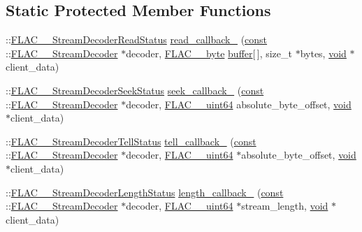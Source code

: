 \subsection*{Static Protected Member Functions}
\begin{DoxyCompactItemize}
\item 
\+::\hyperlink{group__flac__stream__decoder_gad793ead451206c64a91dc0b851027b93}{F\+L\+A\+C\+\_\+\+\_\+\+Stream\+Decoder\+Read\+Status} \hyperlink{class_f_l_a_c_1_1_decoder_1_1_stream_a2e7bb016b4e178f85707288608670bbe}{read\+\_\+callback\+\_\+} (\hyperlink{getopt1_8c_a2c212835823e3c54a8ab6d95c652660e}{const} \+::\hyperlink{struct_f_l_a_c_____stream_decoder}{F\+L\+A\+C\+\_\+\+\_\+\+Stream\+Decoder} $\ast$decoder, \hyperlink{ordinals_8h_a5eb569b12d5b047cdacada4d57924ee3}{F\+L\+A\+C\+\_\+\+\_\+byte} \hyperlink{structbuffer}{buffer}\mbox{[}$\,$\mbox{]}, size\+\_\+t $\ast$bytes, \hyperlink{sound_8c_ae35f5844602719cf66324f4de2a658b3}{void} $\ast$client\+\_\+data)
\item 
\+::\hyperlink{group__flac__stream__decoder_gac8d269e3c7af1a5889d3bd38409ed67d}{F\+L\+A\+C\+\_\+\+\_\+\+Stream\+Decoder\+Seek\+Status} \hyperlink{class_f_l_a_c_1_1_decoder_1_1_stream_a8ba714e7853330695e9e3cafcba6fdf0}{seek\+\_\+callback\+\_\+} (\hyperlink{getopt1_8c_a2c212835823e3c54a8ab6d95c652660e}{const} \+::\hyperlink{struct_f_l_a_c_____stream_decoder}{F\+L\+A\+C\+\_\+\+\_\+\+Stream\+Decoder} $\ast$decoder, \hyperlink{ordinals_8h_aa78c8c70a3eb8a58af7436f278acde8e}{F\+L\+A\+C\+\_\+\+\_\+uint64} absolute\+\_\+byte\+\_\+offset, \hyperlink{sound_8c_ae35f5844602719cf66324f4de2a658b3}{void} $\ast$client\+\_\+data)
\item 
\+::\hyperlink{group__flac__stream__decoder_ga83708207969383bd7b5c1e9148528845}{F\+L\+A\+C\+\_\+\+\_\+\+Stream\+Decoder\+Tell\+Status} \hyperlink{class_f_l_a_c_1_1_decoder_1_1_stream_ac70969d876767bb21cfd242c11a8fb40}{tell\+\_\+callback\+\_\+} (\hyperlink{getopt1_8c_a2c212835823e3c54a8ab6d95c652660e}{const} \+::\hyperlink{struct_f_l_a_c_____stream_decoder}{F\+L\+A\+C\+\_\+\+\_\+\+Stream\+Decoder} $\ast$decoder, \hyperlink{ordinals_8h_aa78c8c70a3eb8a58af7436f278acde8e}{F\+L\+A\+C\+\_\+\+\_\+uint64} $\ast$absolute\+\_\+byte\+\_\+offset, \hyperlink{sound_8c_ae35f5844602719cf66324f4de2a658b3}{void} $\ast$client\+\_\+data)
\item 
\+::\hyperlink{group__flac__stream__decoder_gad5860157c2bb34501b8b9370472d727a}{F\+L\+A\+C\+\_\+\+\_\+\+Stream\+Decoder\+Length\+Status} \hyperlink{class_f_l_a_c_1_1_decoder_1_1_stream_a56d97978e7f1e383d52937deda98a5bc}{length\+\_\+callback\+\_\+} (\hyperlink{getopt1_8c_a2c212835823e3c54a8ab6d95c652660e}{const} \+::\hyperlink{struct_f_l_a_c_____stream_decoder}{F\+L\+A\+C\+\_\+\+\_\+\+Stream\+Decoder} $\ast$decoder, \hyperlink{ordinals_8h_aa78c8c70a3eb8a58af7436f278acde8e}{F\+L\+A\+C\+\_\+\+\_\+uint64} $\ast$stream\+\_\+length, \hyperlink{sound_8c_ae35f5844602719cf66324f4de2a658b3}{void} $\ast$client\+\_\+data)

\end{DoxyCompactItemize}
